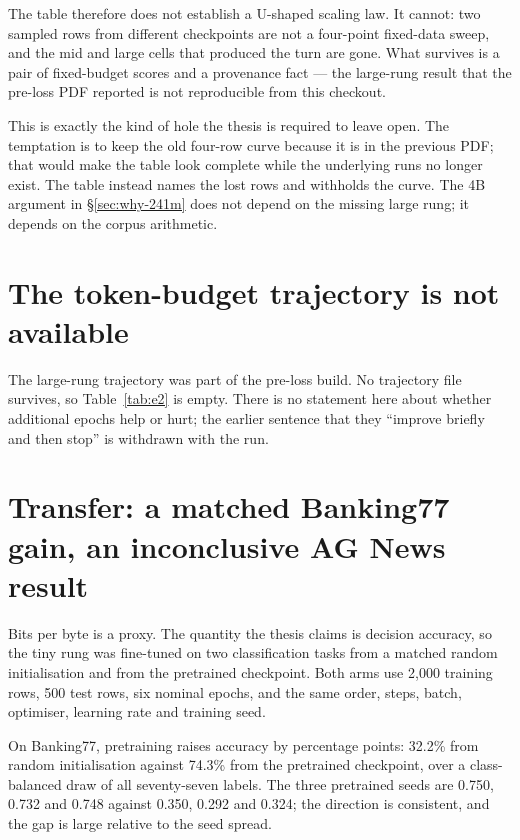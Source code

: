 The table therefore does not establish a U-shaped scaling law. It cannot: two
sampled rows from different checkpoints are not a four-point fixed-data sweep, and
the mid and large cells that produced the turn are gone. What survives is a pair
of fixed-budget scores and a provenance fact --- the large-rung result that the
pre-loss PDF reported is not reproducible from this checkout.

This is exactly the kind of hole the thesis is required to leave open. The
temptation is to keep the old four-row curve because it is in the previous PDF;
that would make the table look complete while the underlying runs no longer exist.
The table instead names the lost rows and withholds the curve. The 4B argument in
\S\ref{sec:why-241m} does not depend on the missing large rung; it depends on the
corpus arithmetic.



\section{The token-budget trajectory is not available}
\label{sec:e2}

The large-rung trajectory was part of the pre-loss build. No trajectory file
survives, so Table~\ref{tab:e2} is empty. There is no statement here about whether
additional epochs help or hurt; the earlier sentence that they ``improve briefly
and then stop'' is withdrawn with the run.



\section{Transfer: a matched Banking77 gain, an inconclusive AG News result}
\label{sec:transfer}

Bits per byte is a proxy. The quantity the thesis claims is decision accuracy, so
the tiny rung was fine-tuned on two classification tasks from a matched random
initialisation and from the pretrained checkpoint. Both arms use 2,000 training
rows, 500 test rows, six nominal epochs, and the same order, steps, batch,
optimiser, learning rate and training seed.



On Banking77, pretraining raises accuracy by \TransferBankGain{} percentage
points: 32.2\% from random initialisation against 74.3\% from the pretrained
checkpoint, over a class-balanced draw of all seventy-seven labels. The three
pretrained seeds are 0.750, 0.732 and 0.748 against 0.350, 0.292 and 0.324; the
direction is consistent, and the gap is large relative to the seed spread.

